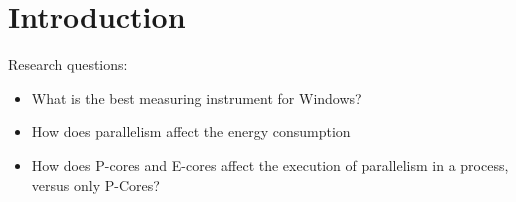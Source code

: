 \section{Introduction}

Research questions:

\begin{itemize}
    \item What is the best measuring instrument for Windows? %
    \item How does parallelism affect the energy consumption
    \item How does P-cores and E-cores affect the execution of parallelism in a process, versus only P-Cores?
\end{itemize}




